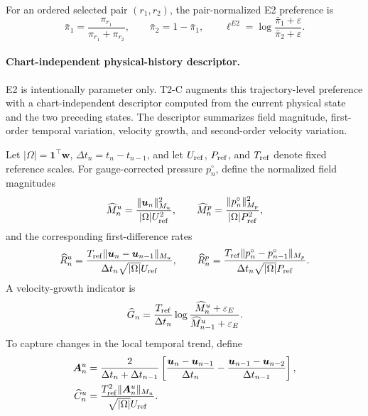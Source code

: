 \documentclass{article}
\begin{document}
For an ordered selected pair $(r_1,r_2)$, the pair-normalized E2
preference is
\begin{equation}
  \bar\pi_1
  =
  \frac{\pi_{r_1}}
       {\pi_{r_1}+\pi_{r_2}},
  \qquad
  \bar\pi_2
  =
  1-\bar\pi_1,
  \qquad
  \ell^{E2}
  =
  \log
  \frac{\bar\pi_1+\varepsilon}
       {\bar\pi_2+\varepsilon}.
  \label{eq:app_pair_logit}
\end{equation}


\paragraph{Chart-independent physical-history descriptor.}
E2 is intentionally parameter only.
T2-C augments this trajectory-level preference with a chart-independent
descriptor computed from the current physical state and the two preceding
states.
The descriptor summarizes field magnitude, first-order temporal variation,
velocity growth, and second-order velocity variation.

Let
$|\Omega|=\bm 1^\top\bm w$,
$\Delta t_n=t_n-t_{n-1}$,
and let $U_{\rm ref}$, $P_{\rm ref}$, and $T_{\rm ref}$ denote fixed
reference scales.
For gauge-corrected pressure $p_n^\circ$, define the normalized field
magnitudes
\begin{equation}
  \widehat M_n^u
  =
  \frac{
    \|\bm u_n\|_{M_u}^2
  }{
    |\Omega|U_{\rm ref}^2
  },
  \qquad
  \widehat M_n^p
  =
  \frac{
    \|p_n^\circ\|_{M_p}^2
  }{
    |\Omega|P_{\rm ref}^2
  },
  \label{eq:app_t2c_magnitude}
\end{equation}
and the corresponding first-difference rates
\begin{equation}
  \widehat R_n^u
  =
  \frac{
    T_{\rm ref}
    \|\bm u_n-\bm u_{n-1}\|_{M_u}
  }{
    \Delta t_n\sqrt{|\Omega|}U_{\rm ref}
  },
  \qquad
  \widehat R_n^p
  =
  \frac{
    T_{\rm ref}
    \|p_n^\circ-p_{n-1}^\circ\|_{M_p}
  }{
    \Delta t_n\sqrt{|\Omega|}P_{\rm ref}
  }.
  \label{eq:app_t2c_rate}
\end{equation}
A velocity-growth indicator is
\begin{equation}
  \widehat G_n
  =
  \frac{T_{\rm ref}}{\Delta t_n}
  \log
  \frac{
    \widehat M_n^u+\varepsilon_E
  }{
    \widehat M_{n-1}^u+\varepsilon_E
  }.
  \label{eq:app_t2c_growth}
\end{equation}
To capture changes in the local temporal trend, define
\begin{align}
  \bm A_n^u
  &=
  \frac{2}{\Delta t_n+\Delta t_{n-1}}
  \left[
    \frac{\bm u_n-\bm u_{n-1}}{\Delta t_n}
    -
    \frac{\bm u_{n-1}-\bm u_{n-2}}{\Delta t_{n-1}}
  \right],
  \nonumber\\
  \widehat C_n^u
  &=
  \frac{
    T_{\rm ref}^2
    \|\bm A_n^u\|_{M_u}
  }{
    \sqrt{|\Omega|}U_{\rm ref}
  }.
  \label{eq:app_t2c_curvature}
\end{align}
\end{document}
